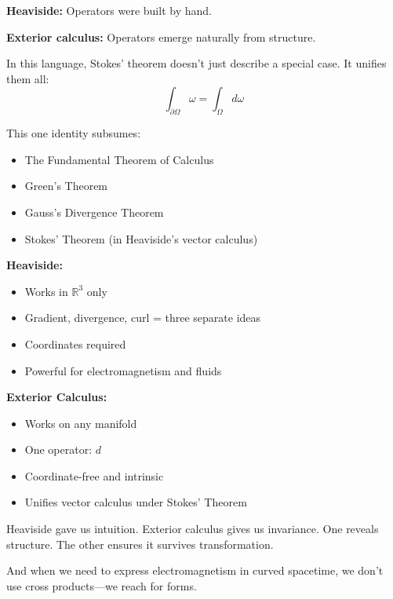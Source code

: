 \bigskip

\textbf{Heaviside:}  
Operators were built by hand.

\textbf{Exterior calculus:}  
Operators emerge naturally from structure.

In this language, Stokes’ theorem doesn’t just describe a special case. It unifies them all:
\[
\int_{\partial \Omega} \omega = \int_\Omega d\omega
\]

This one identity subsumes:
\begin{itemize}
    \item The Fundamental Theorem of Calculus
    \item Green’s Theorem
    \item Gauss’s Divergence Theorem
    \item Stokes’ Theorem (in Heaviside’s vector calculus)
\end{itemize}

\bigskip

\begin{tcolorbox}[colback=gray!5!white, colframe=black, title=\textbf{Sidebar: Vector Calculus vs. Differential Forms}, fonttitle=\bfseries, arc=1.5mm, boxrule=0.4pt]

\textbf{Heaviside:}
\begin{itemize}
  \item Works in \( \mathbb{R}^3 \) only
  \item Gradient, divergence, curl = three separate ideas
  \item Coordinates required
  \item Powerful for electromagnetism and fluids
\end{itemize}

\textbf{Exterior Calculus:}
\begin{itemize}
  \item Works on any manifold
  \item One operator: \( d \)
  \item Coordinate-free and intrinsic
  \item Unifies vector calculus under Stokes’ Theorem
\end{itemize}

\end{tcolorbox}

\bigskip

Heaviside gave us intuition. Exterior calculus gives us invariance.  
One reveals structure. The other ensures it survives transformation.

And when we need to express electromagnetism in curved spacetime,  
we don't use cross products—we reach for forms.

